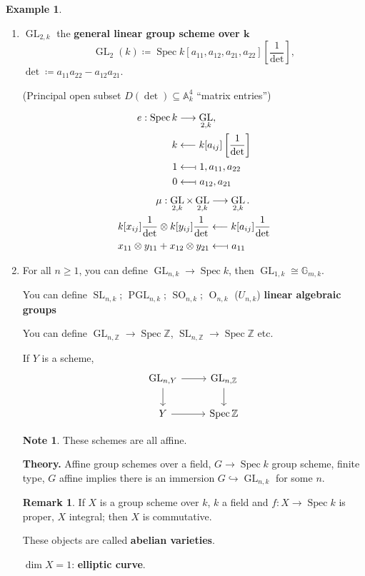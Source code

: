 \documentclass[12pt]{article}
\DeclareMathOperator{\Spec}{Spec}
\DeclareMathOperator{\GL}{GL}
\DeclareMathOperator{\SL}{SL}
\DeclareMathOperator{\PGL}{PGL}
\DeclareMathOperator{\SO}{SO}
\DeclareMathOperator{\OG}{O}
\theoremstyle{definition}
\newtheorem*{remark}{Remark}
\newtheorem*{note}{Note}
\newtheorem*{example}{Example}
\begin{document}
\begin{example}
\begin{enumerate}[label=\arabic*)]
\item $\GL_{2,k}$ the \textbf{general linear group scheme over $\boldsymbol k$}
\[\GL_2(k)\coloneqq\Spec k[a_{11},a_{12},a_{21},a_{22}]\left[\frac1\det\right],\]
$\det\coloneqq a_{11}a_{22}-a_{12}a_{21}$.

(Principal open subset $D(\det)\subseteq\mathbb A_k^4$ ``matrix entries'')

\begin{align*}
e:\Spec k&\longrightarrow \GL_{2,k},\\k&\longleftarrow k[a_{ij}]\left[\frac1\det\right]\\1&\longleftarrow\!\shortmid1,a_{11},a_{22}\\0&\longleftarrow\!\shortmid a_{12},a_{21}
\end{align*}
\begin{align*}
\mu:\GL_{2,k}\times\GL_{2,k}&\longrightarrow\GL_{2,k}.\\k[x_{ij}]\frac1\det\otimes k[y_{ij}]\frac1\det&\longleftarrow k[a_{ij}]\frac1\det\\x_{11}\otimes y_{11}+x_{12}\otimes y_{21}&\longleftarrow\!\shortmid a_{11}
\end{align*}

\item For all $n\geq1$, you can define $\GL_{n,k}\rightarrow\Spec k$, then $\GL_{1,k}\cong\mathbb G_{m,k}$.

You can define $\SL_{n,k}$; $\PGL_{n,k}$; $\SO_{n,k}$; $\OG_{n,k}$ ($U_{n,k}$) \textbf{linear algebraic groups}

You can define $\GL_{n,\mathbb Z}\rightarrow\Spec\mathbb Z$, $\SL_{n,\mathbb Z}\rightarrow\Spec\mathbb Z$ etc.

If $Y$ is a scheme,
\[\begin{tikzcd}\GL_{n,Y}\arrow[r]\arrow[d]&\GL_{n,\mathbb Z}\arrow[d]\\Y\arrow[r]&\Spec\mathbb Z\end{tikzcd}\]

\begin{note}
These schemes are all affine.
\end{note}

\textbf{Theory.} Affine group schemes over a field, $G\rightarrow\Spec k$ group scheme, finite type, $G$ affine implies there is an immersion $G\hookrightarrow\GL_{n,k}$ for some $n$.

\begin{remark}
If $X$ is a group scheme over $k$, $k$ a field and $f:X\rightarrow\Spec k$ is proper, $X$ integral; then $X$ is commutative.

These objects are called \textbf{abelian varieties}.

$\dim X=1$: \textbf{elliptic curve}.
\end{remark}
\end{enumerate}
\end{example}
\end{document}
